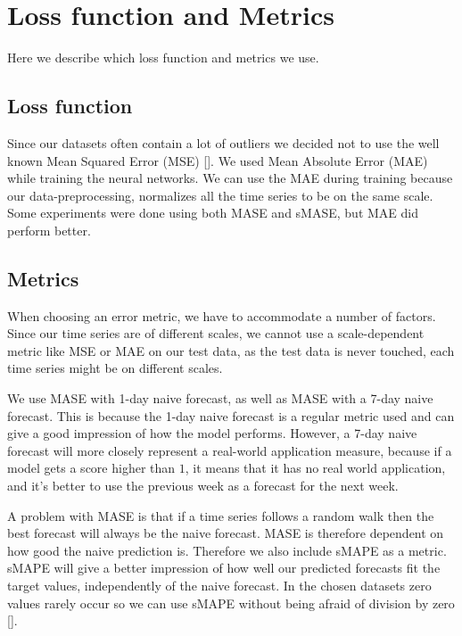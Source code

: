 
\section{Loss function and Metrics}
\label{section:Method:Metrics}

Here we describe which loss function and metrics we use.

\subsection*{Loss function}
Since our datasets often contain a lot of outliers we decided not to use the well known
Mean Squared Error (MSE) [].
We used Mean Absolute Error (MAE) while training the neural networks. We can use the MAE during training because our data-preprocessing,
normalizes all the time series to be on the same scale.
Some experiments were done using both MASE and sMASE, but MAE did perform better.

\subsection*{Metrics}
When choosing an error metric, we have to accommodate a number of factors.
Since our time series are of different scales, we cannot use a scale-dependent metric
like MSE or MAE on our test data, as the test data is never touched, each time series might be on different scales.

We use MASE with 1-day naive forecast, as well as MASE with a 7-day
naive forecast. This is because the 1-day naive forecast is a regular metric used
and can give a good impression of how the model performs.
However, a 7-day naive forecast will more closely represent a real-world application measure,
because if a model gets a score higher than $1$, it means that it has no real world application,
and it's better to use the previous week as a forecast for the next week.

A problem with MASE is that if a time series follows a random walk
then the best forecast will always be the naive forecast. MASE is therefore dependent on
how good the naive prediction is.
Therefore we also include sMAPE as a metric.
sMAPE will give a better impression of how well our predicted forecasts fit the target values,
independently of the naive forecast.
In the chosen datasets zero values rarely occur so we can use sMAPE without
being afraid of division by zero [].

